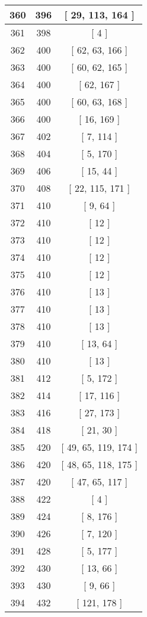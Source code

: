 \begin{center}
\begin{longtable}[H]{|| c c c ||}
\hline
360 & 396 & [ 29, 113, 164 ] \\ 
\hline
361 & 398 & [ 4 ] \\ 
\hline
362 & 400 & [ 62, 63, 166 ] \\ 
\hline
363 & 400 & [ 60, 62, 165 ] \\ 
\hline
364 & 400 & [ 62, 167 ] \\ 
\hline
365 & 400 & [ 60, 63, 168 ] \\ 
\hline
366 & 400 & [ 16, 169 ] \\ 
\hline
367 & 402 & [ 7, 114 ] \\ 
\hline
368 & 404 & [ 5, 170 ] \\ 
\hline
369 & 406 & [ 15, 44 ] \\ 
\hline
370 & 408 & [ 22, 115, 171 ] \\ 
\hline
371 & 410 & [ 9, 64 ] \\ 
\hline
372 & 410 & [ 12 ] \\ 
\hline
373 & 410 & [ 12 ] \\ 
\hline
374 & 410 & [ 12 ] \\ 
\hline
375 & 410 & [ 12 ] \\ 
\hline
376 & 410 & [ 13 ] \\ 
\hline
377 & 410 & [ 13 ] \\ 
\hline
378 & 410 & [ 13 ] \\ 
\hline
379 & 410 & [ 13, 64 ] \\ 
\hline
380 & 410 & [ 13 ] \\ 
\hline
381 & 412 & [ 5, 172 ] \\ 
\hline
382 & 414 & [ 17, 116 ] \\ 
\hline
383 & 416 & [ 27, 173 ] \\ 
\hline
384 & 418 & [ 21, 30 ] \\ 
\hline
385 & 420 & [ 49, 65, 119, 174 ] \\ 
\hline
386 & 420 & [ 48, 65, 118, 175 ] \\ 
\hline
387 & 420 & [ 47, 65, 117 ] \\ 
\hline
388 & 422 & [ 4 ] \\ 
\hline
389 & 424 & [ 8, 176 ] \\ 
\hline
390 & 426 & [ 7, 120 ] \\ 
\hline
391 & 428 & [ 5, 177 ] \\ 
\hline
392 & 430 & [ 13, 66 ] \\ 
\hline
393 & 430 & [ 9, 66 ] \\ 
\hline
394 & 432 & [ 121, 178 ] \\ 

\end{longtable}
\end{center}

